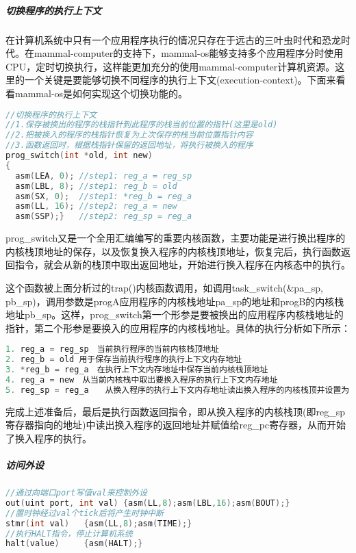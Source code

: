 \subparagraph{切换程序的执行上下文}
在计算机系统中只有一个应用程序执行的情况只存在于远古的三叶虫时代和恐龙时代。在mammal-computer的支持下，mammal-os能够支持多个应用程序分时使用CPU，定时切换执行，这样能更加充分的使用mammal-computer计算机资源。这里的一个关键是要能够切换不同程序的执行上下文(execution-context)。下面来看看mammal-os是如何实现这个切换功能的。

\begin{lstlisting}[language={C}]
//切换程序的执行上下文
//1.保存被换出的程序的栈指针到此程序的栈当前位置的指针(这里是old)
//2.把被换入的程序的栈指针恢复为上次保存的栈当前位置指针内容
//3.函数返回时，根据栈指针保留的返回地址，将执行被换入的程序
prog_switch(int *old, int new) 
{
  asm(LEA, 0); //step1: reg_a = reg_sp　　
  asm(LBL, 8); //step1: reg_b = old
  asm(SX, 0);  //step1: *reg_b = reg_a
  asm(LL, 16); //step2: reg_a = new
  asm(SSP);}   //step2: reg_sp = reg_a
\end{lstlisting}
 
prog\_switch又是一个全用汇编编写的重要内核函数，主要功能是进行换出程序的内核栈顶地址的保存，以及恢复换入程序的内核栈顶地址，恢复完后，执行函数返回指令，就会从新的栈顶中取出返回地址，开始进行换入程序在内核态中的执行。

这个函数被上面分析过的trap()内核函数调用，如调用task\_switch(&pa\_sp, pb\_sp)，调用参数是progA应用程序的内核栈地址pa\_sp的地址和progB的内核栈地址pb\_sp。这样，prog\_switch第一个形参是要被换出的应用程序内核栈地址的指针，第二个形参是要换入的应用程序的内核栈地址。具体的执行分析如下所示：
\begin{lstlisting}[language={C}]
1. reg_a = reg_sp　当前执行程序的当前内核栈顶地址
2. reg_b = old 用于保存当前执行程序的执行上下文内存地址
3. *reg_b = reg_a　在执行上下文内存地址中保存当前内核栈顶地址
4. reg_a = new　从当前内核栈中取出要换入程序的执行上下文内存地址
5. reg_sp = reg_a　　从换入程序的执行上下文内存地址读出换入程序的内核栈顶并设置为reg\_sp
\end{lstlisting}

完成上述准备后，最后是执行函数返回指令，即从换入程序的内核栈顶(即reg\_sp寄存器指向的地址)中读出换入程序的返回地址并赋值给reg\_pc寄存器，从而开始了换入程序的执行。


\subparagraph{访问外设}

\begin{lstlisting}[language={C}]
//通过向端口port写值val来控制外设
out(uint port, int val) {asm(LL,8);asm(LBL,16);asm(BOUT);}
//置时钟经过val个tick后将产生时钟中断
stmr(int val)   {asm(LL,8);asm(TIME);}
//执行HALT指令，停止计算机系统
halt(value)     {asm(HALT);}
\end{lstlisting}



